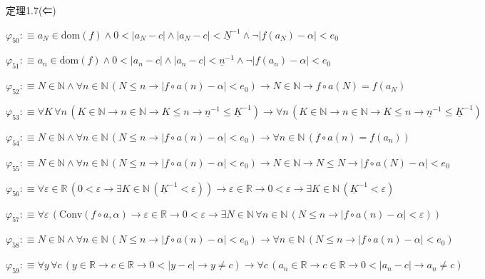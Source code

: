 \begin{fullproof}{定理1.7(⇐)}
\begin{abbrevlist}
\item $\varphi_{50} :\equiv a_{N} \in \mathrm{dom}(f) \land 0 < \lvert a_{N} - c \rvert \land \lvert a_{N} - c \rvert < \underline{N}^{-1} \land \neg \lvert f(a_{N}) - \alpha \rvert < e_{0}$
\item $\varphi_{51} :\equiv a_{n} \in \mathrm{dom}(f) \land 0 < \lvert a_{n} - c \rvert \land \lvert a_{n} - c \rvert < \underline{n}^{-1} \land \neg \lvert f(a_{n}) - \alpha \rvert < e_{0}$
\item $\varphi_{52} :\equiv N \in \mathbb{N} \land \forall n \in \mathbb{N}\,(N \leq n \to \lvert f \circ a(n) - \alpha \rvert < e_{0}) \to N \in \mathbb{N} \to f \circ a(N) = f(a_{N})$
\item $\varphi_{53} :\equiv \forall K\,\forall n\,(K \in \mathbb{N} \to n \in \mathbb{N} \to K \leq n \to \underline{n}^{-1} \leq \underline{K}^{-1}) \to \forall n\,(K \in \mathbb{N} \to n \in \mathbb{N} \to K \leq n \to \underline{n}^{-1} \leq \underline{K}^{-1})$
\item $\varphi_{54} :\equiv N \in \mathbb{N} \land \forall n \in \mathbb{N}\,(N \leq n \to \lvert f \circ a(n) - \alpha \rvert < e_{0}) \to \forall n \in \mathbb{N}\,(f \circ a(n) = f(a_{n}))$
\item $\varphi_{55} :\equiv N \in \mathbb{N} \land \forall n \in \mathbb{N}\,(N \leq n \to \lvert f \circ a(n) - \alpha \rvert < e_{0}) \to N \in \mathbb{N} \to N \leq N \to \lvert f \circ a(N) - \alpha \rvert < e_{0}$
\item $\varphi_{56} :\equiv \forall \varepsilon \in \mathbb{R}\,(0 < \varepsilon \to \exists K \in \mathbb{N}\,(\underline{K}^{-1} < \varepsilon)) \to \varepsilon \in \mathbb{R} \to 0 < \varepsilon \to \exists K \in \mathbb{N}\,(\underline{K}^{-1} < \varepsilon)$
\item $\varphi_{57} :\equiv \forall \varepsilon\,(\mathrm{Conv}(f \circ a,\alpha) \to \varepsilon \in \mathbb{R} \to 0 < \varepsilon \to \exists N \in \mathbb{N}\,\forall n \in \mathbb{N}\,(N \leq n \to \lvert f \circ a(n) - \alpha \rvert < \varepsilon))$
\item $\varphi_{58} :\equiv N \in \mathbb{N} \land \forall n \in \mathbb{N}\,(N \leq n \to \lvert f \circ a(n) - \alpha \rvert < e_{0}) \to \forall n \in \mathbb{N}\,(N \leq n \to \lvert f \circ a(n) - \alpha \rvert < e_{0})$
\item $\varphi_{59} :\equiv \forall y\,\forall c\,(y \in \mathbb{R} \to c \in \mathbb{R} \to 0 < \lvert y - c \rvert \to y \neq c) \to \forall c\,(a_{n} \in \mathbb{R} \to c \in \mathbb{R} \to 0 < \lvert a_{n} - c \rvert \to a_{n} \neq c)$

\end{abbrevlist}
\end{fullproof}
